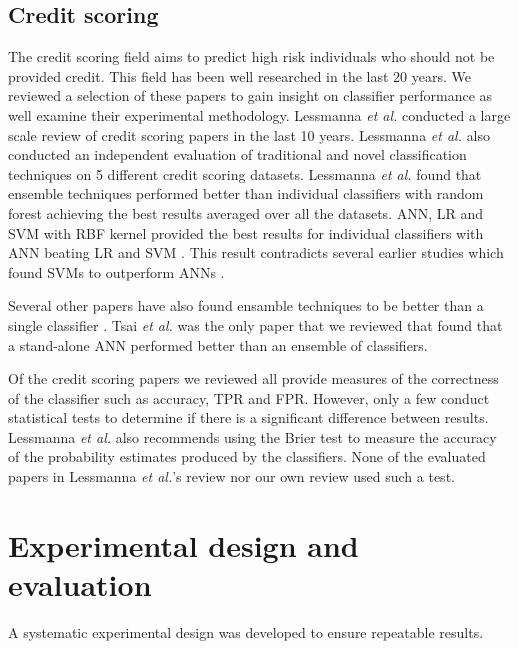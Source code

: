 \documentclass{sig-alternate-05-2015}
\begin{document}
	\subsection{Credit scoring}
	\label{credit-scoring-review}
	The credit scoring field aims to predict high risk individuals who should not be provided credit. This field has been well researched in the last 20 years. We reviewed a selection of these papers to gain insight on classifier performance as well examine their experimental methodology. Lessmanna \textit{et al.} \cite{lessmanna2013benchmarking} conducted a large scale review of credit scoring papers in the last 10 years. Lessmanna \textit{et al.} \cite{lessmanna2013benchmarking} also conducted an independent evaluation of traditional and novel classification techniques on 5 different credit scoring datasets. Lessmanna \textit{et al.} \cite{lessmanna2013benchmarking} found that ensemble techniques performed better than individual classifiers with random forest achieving the best results averaged over all the datasets. ANN, LR and SVM with RBF kernel provided the best results for individual classifiers with ANN beating LR and SVM \cite{lessmanna2013benchmarking}. This result contradicts several earlier studies which found SVMs to outperform ANNs \cite{Danenas20153194, Huang2007847, Huang2004543, Li2006772}. 
	
	Several other papers have also found ensamble techniques to be better than a single classifier \cite{Hsieh2010534, Nanni20093028, Twala20103326, Wang2011223}. Tsai \textit{et al.} \cite{Tsai20082639} was the only paper that we reviewed that found that a stand-alone ANN performed better than an ensemble of classifiers.
	
	Of the credit scoring papers we reviewed \cite{Abdou2016, Angelini2008733, Bekhet201420, Danenas20153194, Desai199624, Hsieh2010534, Huang2004543, Huang2007847, Lee2002245, Li2006772, Luo20097562, Malhotra200383, Nanni20093028, Tsai20082639, Twala20103326, Wang2011223} all provide measures of the correctness of the classifier such as accuracy, TPR and FPR. However, only a few \cite{Desai199624, Huang2004543, Malhotra200383, Wang2011223} conduct statistical tests to determine if there is a significant difference between results. Lessmanna \textit{et al.} also recommends using the Brier test to measure the accuracy of the probability estimates produced by the classifiers. None of the evaluated papers in Lessmanna \textit{et al.}'s review nor our own review used such a test.
	
	\section{Experimental design and evaluation}
	A systematic experimental design was developed to ensure repeatable results.
\end{document}
